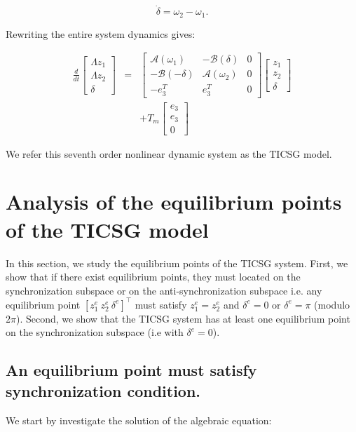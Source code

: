 \documentclass[letterpaper, 10 pt, conference]{ieeeconf}  %
\begin{document}
\[
\dot{\delta}=\omega_{2}-\omega_{1}.
\]

Rewriting the entire system dynamics gives:

\begin{equation}
\begin{array}{ccc}
\frac{d}{dt}\left[\begin{array}{c}
\varLambda z_{1}\\
\varLambda z_{2}\\
\delta
\end{array}\right] & = & \left[\begin{array}{c|c|c}
\mathcal{A}(\omega_{1}) & -\mathcal{B}(\delta) & 0\\
\hline -\mathcal{B}(-\delta) & \mathcal{A}(\omega_{2}) & 0\\
\hline -e_{3}^{T} & e_{3}^{T} & 0
\end{array}\right]\left[\begin{array}{c}
z_{1}\\
z_{2}\\
\delta
\end{array}\right]\\
 &  & +T_{m}\left[\begin{array}{c}
e_{3}\\
e_{3}\\
0
\end{array}\right]
\end{array}\label{eq:TICSGDynamics}
\end{equation}

We refer this seventh order nonlinear dynamic system as the TICSG model.

\section{Analysis of the equilibrium points of the TICSG model \label{sec:equivalence_pont}}

In this section, we study the equilibrium points of the TICSG system. First, we show that  if there exist equilibrium points, they must located on the synchronization subspace or on the anti-synchronization subspace i.e. any equilibrium point $\left[z_1^e \ z_2^e \ \delta^e \right]^\top$ must satisfy $z_1^e=z_2^e$ and $\delta^e=0$ or $\delta^e = \pi$   (modulo $2\pi$). Second, we show that the TICSG system has at least one equilibrium point on the synchronization subspace (i.e with $\delta^e=0$).

\subsection{An equilibrium point must satisfy synchronization condition.}
We  start by investigate the solution of the algebraic equation:  
\end{document}
